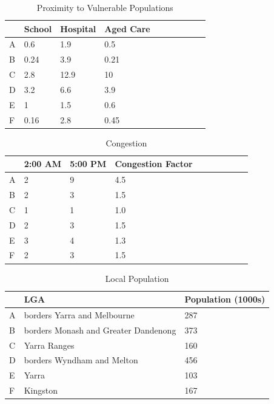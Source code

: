 \documentclass[11pt, a4paper]{article}
\begin{document}
    \begin{table}[!ht]
        \centering
        \begin{tabular}{|l|l|l|l|l|l|l|l|l|l|}
        \hline
            ~ & School & Hospital & Aged Care        \\ \hline
            A & 0.6 & 1.9 & 0.5        \\ \hline
            B & 0.24 & 3.9 & 0.21        \\ \hline
            C & 2.8 & 12.9 & 10        \\ \hline
            D & 3.2 & 6.6 & 3.9        \\ \hline
            E & 1 & 1.5 & 0.6        \\ \hline
            F & 0.16 & 2.8 & 0.45        \\ \hline
        \end{tabular}
        \caption{Proximity to Vulnerable Populations}
        \label{t6}
    \end{table}

    \begin{table}[!ht]
        \centering
        \begin{tabular}{|l|l|l|l|l|l|l|l|l|l|}
        \hline
            ~ & 2:00 AM & 5:00 PM & Congestion Factor        \\ \hline
            A & 2 & 9 & 4.5        \\ \hline
            B & 2 & 3 & 1.5        \\ \hline
            C & 1 & 1 & 1.0        \\ \hline
            D & 2 & 3 & 1.5        \\ \hline
            E & 3 & 4 & 1.3        \\ \hline
            F & 2 & 3 & 1.5        \\ \hline
        \end{tabular}
        \caption{Congestion}
        \label{t7}
    \end{table}

    \begin{table}[!ht]
        \centering
        \begin{tabular}{|l|l|l|}
        \hline
            ~ & LGA & Population (1000s)  \\ \hline
            A & borders Yarra and Melbourne & 287  \\ \hline
            B & borders Monash and Greater Dandenong & 373  \\ \hline
            C & Yarra Ranges & 160  \\ \hline
            D & borders Wyndham and Melton & 456  \\ \hline
            E & Yarra & 103  \\ \hline
            F & Kingston & 167  \\ \hline
        \end{tabular}
        \caption{Local Population}
        \label{t8}
    \end{table}
\end{document}
